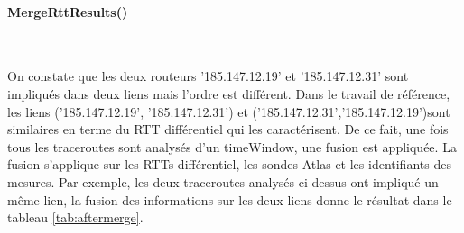 \begin{landscape}
\begin{table}[H]
{\begin{tabular}{|l|}
						\\ \hline
					\end{tabular}
				}
			\end{table}
		\end{landscape}

\paragraph{MergeRttResults()}~

On constate que les deux routeurs '185.147.12.19' et '185.147.12.31' sont impliqués dans deux liens  mais l'ordre est différent. Dans le travail de référence, les liens ('185.147.12.19', '185.147.12.31') et ('185.147.12.31','185.147.12.19')sont similaires en terme du RTT différentiel qui les caractérisent. De ce fait, une fois tous les traceroutes sont analysés d'un timeWindow, une fusion est appliquée. 
La fusion s'applique sur les RTTs différentiel, les sondes Atlas et les identifiants des mesures.  Par exemple, les deux traceroutes analysés ci-dessus ont impliqué un même lien, la fusion des informations sur les deux liens donne le résultat dans le tableau \ref{tab:aftermerge}.


